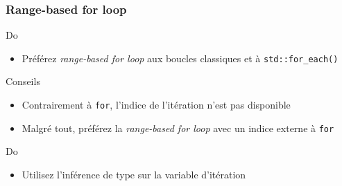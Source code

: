 \documentclass[C++.tex]{subfiles}
\begin{document}
\begin{frame}
	\frametitle{Range-based for loop}
	\begin{exampleblock}{Do}
		\begin{itemize}
			\item Préférez \textit{range-based for loop} aux boucles classiques et à \lstinline|std::for_each()|
		\end{itemize}
	\end{exampleblock}


	\begin{block}{Conseils}
		\begin{itemize}
			\item Contrairement à \lstinline|for|, l'indice de l'itération n'est pas disponible
			\item Malgré tout, préférez la \textit{range-based for loop} avec un indice externe à \lstinline|for|

		\end{itemize}
	\end{block}

	\begin{exampleblock}{Do}
		\begin{itemize}
			\item Utilisez l'inférence de type sur la variable d'itération
		\end{itemize}
	\end{exampleblock}
\end{frame}
\end{document}
